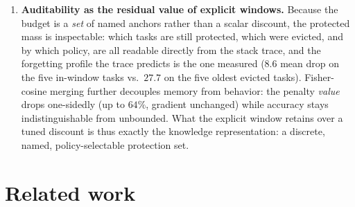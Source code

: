 \documentclass[review,12pt,number]{elsarticle}
\begin{document}
\begin{enumerate}
monotone at every grid $\lambda$; the same four-arm fit at $T{=}10$
gives a shallower slope, $-3.8$, $R^2{=}0.96$): bounding accumulated
anchor mass, not the mechanism enforcing it, is the active ingredient.
\item \textbf{Auditability as the residual value of explicit windows.}
Because the budget is a \emph{set} of named anchors rather than a
scalar discount, the protected mass is inspectable: which tasks are
still protected, which were evicted, and by which policy, are all
readable directly from the stack trace, and the forgetting profile the
trace predicts is the one measured ($8.6$ mean drop on the five
in-window tasks vs.\ $27.7$ on the five oldest evicted tasks). Fisher-cosine merging further decouples memory
from behavior: the penalty \emph{value} drops one-sidedly (up to
$64\%$, gradient unchanged) while accuracy stays indistinguishable from
unbounded. What the explicit window retains over a tuned discount is
thus exactly the knowledge representation: a discrete, named,
policy-selectable protection set.
\end{enumerate}

\section{Related work}
\label{sec:related}
\end{document}
